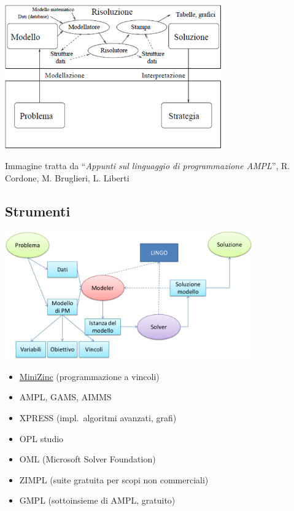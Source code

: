 \documentclass{beamer}
\def\lyxframeend{} %
\begin{document}
\lyxframeend{}

\begin{center}
\includegraphics[width=0.7\textwidth]{img/approccio_modellistico}
\par\end{center}

\vspace*{-0.5cm}

\begin{center}
{\tiny Immagine tratta da ``\textit{Appunti sul
linguaggio di programmazione AMPL}'', R. Cordone,
M. Bruglieri, L. Liberti}
\end{center}


\lyxframeend{}\subsection{Strumenti}


\lyxframeend{}

\begin{center}
\includegraphics[width=0.8\textwidth]{img/linguaggi_mod_alg}
\par\end{center}


\lyxframeend{}
\begin{itemize}
\item \href{https://www.minizinc.org/}{MiniZinc} (programmazione a vincoli)
\item AMPL, GAMS, AIMMS
\item XPRESS (impl.\ algoritmi avanzati, grafi)
\item OPL studio
\item OML (Microsoft Solver Foundation)
\item ZIMPL (suite gratuita per scopi non commerciali)
\item GMPL (sottoinsieme di AMPL, gratuito)
\end{itemize}
\end{document}
